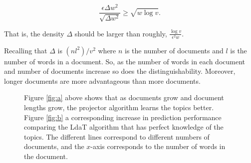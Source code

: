$$\frac{\epsilon \Delta w^2}{\sqrt{\Delta w^2}} \geq  \sqrt{w \log v}.$$

That is, the density $\Delta$ should be larger than roughly,
$\frac{\log v}{\epsilon^2 w}$.

Recalling that $\Delta$ is $(n l^2)/v^2$ where $n$ is the number of
documents and $l$ is the number of words in a document.  So, as the
number of words in each document and number of documents increase so
does the distinguishability.  Moreover, longer documents are more
advantageous than more documents.

\begin{figure}
     \begin{center}



    \end{center}
    \caption{Figure \ref{fig:a} above shows that as documents grow and document lengths grow, the projector algorithm
learns the topics better.  Figure \ref{fig:b} a corresponding increase in prediction performance comparing the LdaT algorithm that has perfect knowledge of the topics.  The different lines correspond to different numbers of documents, and the $x$-axis corresponds to the number of words in the document.}
   \label{fig:size-matters}
\end{figure}



